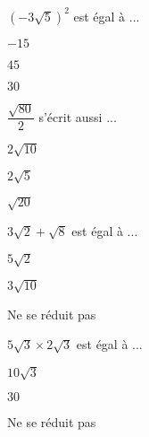 



\begin{QCM}

\begin{GroupeQCM}

\begin{exercice}$(-3\sqrt{5})^2$ est égal à ...
\begin{ChoixQCM}{3}
\item $-15$
\item $45$
\item $30$
\end{ChoixQCM}
\begin{corrige}
\end{corrige}
\end{exercice}

\begin{exercice}$\dfrac{\sqrt{80}}{2}$ s'écrit aussi ...
\begin{ChoixQCM}{3}
\item $2\sqrt{10}$
\item $2\sqrt{5}$
\item $\sqrt{20}$
\end{ChoixQCM}
\begin{corrige}
\end{corrige}
\end{exercice}

\begin{exercice}$3\sqrt{2}+\sqrt{8}$ est égal à ...
\begin{ChoixQCM}{3}
\item $5\sqrt{2}$
\item $3\sqrt{10}$
\item Ne se réduit pas
\end{ChoixQCM}
\begin{corrige}
\end{corrige}
\end{exercice}

\begin{exercice}$5\sqrt{3} \times 2\sqrt{3}$ est égal à ...
\begin{ChoixQCM}{3}
\item $10\sqrt{3}$
\item $30$
\item Ne se réduit pas
\end{ChoixQCM}
\begin{corrige}
\end{corrige}
\end{exercice}


\end{GroupeQCM}
\end{QCM}
